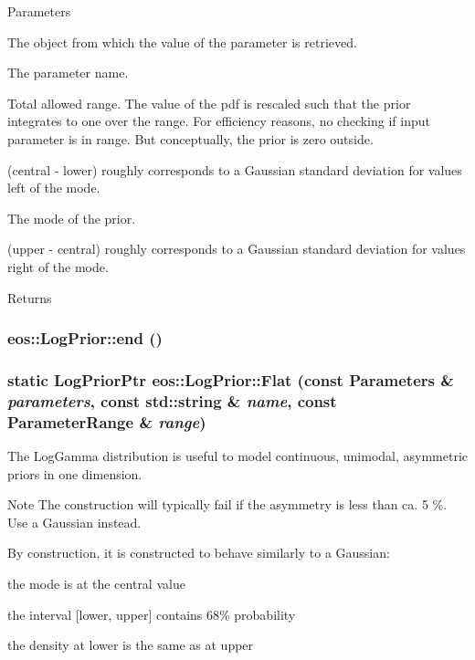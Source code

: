 \begin{DoxyParams}{Parameters}
\item[{\em parameters}]The object from which the value of the parameter is retrieved. \item[{\em name}]The parameter name. \item[{\em range}]Total allowed range. The value of the pdf is rescaled such that the prior integrates to one over the range. For efficiency reasons, no checking if input parameter is in range. But conceptually, the prior is zero outside. \item[{\em lower}](central -\/ lower) roughly corresponds to a Gaussian standard deviation for values left of the mode. \item[{\em central}]The mode of the prior. \item[{\em upper}](upper -\/ central) roughly corresponds to a Gaussian standard deviation for values right of the mode. \end{DoxyParams}
\begin{DoxyReturn}{Returns}

\end{DoxyReturn}
\hypertarget{classeos_1_1LogPrior_a093e33ea2441515348249835a99781ba}{
\subsubsection[{end}]{ eos::LogPrior::end ()}}
\label{classeos_1_1LogPrior_a093e33ea2441515348249835a99781ba}
\hypertarget{classeos_1_1LogPrior_ad4c2afcb1df01ef6ff1f2f8402cc7636}{
\subsubsection[{Flat}]{\setlength{\rightskip}{0pt plus 5cm}static {\bf LogPriorPtr} eos::LogPrior::Flat (const {\bf Parameters} \& {\em parameters}, \/  const std::string \& {\em name}, \/  const {\bf ParameterRange} \& {\em range})}}
\label{classeos_1_1LogPrior_ad4c2afcb1df01ef6ff1f2f8402cc7636}
The LogGamma distribution is useful to model continuous, unimodal, asymmetric priors in one dimension.

\begin{DoxyNote}{Note}
The construction will typically fail if the asymmetry is less than ca. 5 \%. Use a Gaussian instead.
\end{DoxyNote}
By construction, it is constructed to behave similarly to a Gaussian:
\begin{DoxyItemize}
\item the mode is at the central value
\item the interval \mbox{[}lower, upper\mbox{]} contains 68\% probability
\item the density at lower is the same as at upper
\end{DoxyItemize}


